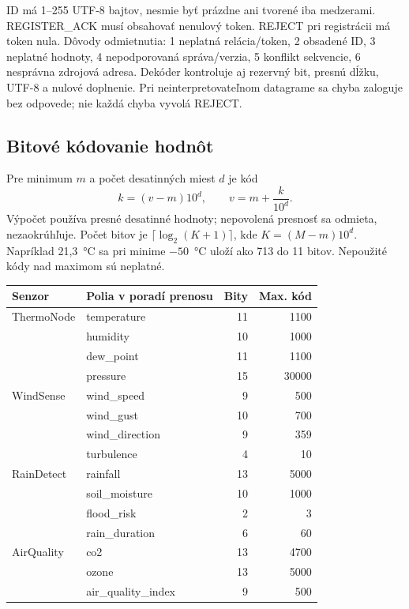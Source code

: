 \documentclass[12pt,a4paper]{article}
\begin{document}
ID má 1--255 UTF-8 bajtov, nesmie byť prázdne ani tvorené iba medzerami. REGISTER\_ACK musí obsahovať nenulový token. REJECT pri registrácii má token nula. Dôvody odmietnutia: 1 neplatná relácia/token, 2 obsadené ID, 3 neplatné hodnoty, 4 nepodporovaná správa/verzia, 5 konflikt sekvencie, 6 nesprávna zdrojová adresa. Dekóder kontroluje aj rezervný bit, presnú dĺžku, UTF-8 a nulové doplnenie. Pri neinterpretovateľnom datagrame sa chyba zaloguje bez odpovede; nie každá chyba vyvolá REJECT.

\subsection{Bitové kódovanie hodnôt}

Pre minimum $m$ a počet desatinných miest $d$ je kód
\[
 k=(v-m)10^d,\qquad v=m+\frac{k}{10^d}.
\]
Výpočet používa presné desatinné hodnoty; nepovolená presnosť sa odmieta, nezaokrúhľuje. Počet bitov je $\lceil\log_2(K+1)\rceil$, kde $K=(M-m)10^d$. Napríklad 21,3~°C sa pri minime $-50$~°C uloží ako 713 do 11 bitov. Nepoužité kódy nad maximom sú neplatné.

\begin{center}\small\singlespacing
\begin{tabular}{l l r r}
\hline Senzor & Polia v poradí prenosu & Bity & Max. kód \\\hline
ThermoNode & temperature & 11 & 1100 \\
 & humidity & 10 & 1000 \\
 & dew\_point & 11 & 1100 \\
 & pressure & 15 & 30000 \\\hline
WindSense & wind\_speed & 9 & 500 \\
 & wind\_gust & 10 & 700 \\
 & wind\_direction & 9 & 359 \\
 & turbulence & 4 & 10 \\\hline
RainDetect & rainfall & 13 & 5000 \\
 & soil\_moisture & 10 & 1000 \\
 & flood\_risk & 2 & 3 \\
 & rain\_duration & 6 & 60 \\\hline
AirQuality & co2 & 13 & 4700 \\
 & ozone & 13 & 5000 \\
 & air\_quality\_index & 9 & 500 \\\hline
\end{tabular}\end{center}
\end{document}

